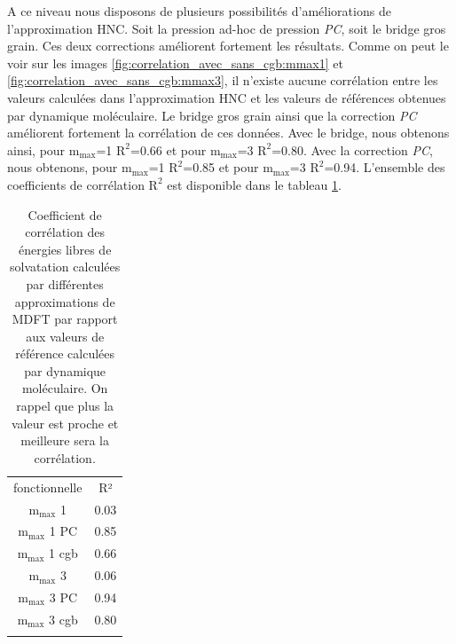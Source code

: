 A ce niveau nous disposons de plusieurs possibilités d'améliorations de l'approximation HNC. Soit la pression ad-hoc de pression \textit{PC}, soit le bridge gros grain. Ces deux corrections améliorent fortement les résultats. Comme on peut le voir sur les images \ref{fig:correlation_avec_sans_cgb:mmax1} et \ref{fig:correlation_avec_sans_cgb:mmax3}, il n'existe aucune corrélation entre les valeurs calculées dans l'approximation HNC et les valeurs de références obtenues par dynamique moléculaire. 
Le bridge gros grain ainsi que la correction \textit{PC} améliorent fortement la corrélation de ces données. Avec le bridge, nous obtenons ainsi, pour $\mathrm{m}_\mathrm{max}$=1 $\mathrm{R}^2$=0.66 et pour $\mathrm{m}_\mathrm{max}$=3 $\mathrm{R}^2$=0.80. Avec la correction \textit{PC}, nous obtenons, pour $\mathrm{m}_\mathrm{max}$=1 $\mathrm{R}^2$=0.85 et pour $\mathrm{m}_\mathrm{max}$=3 $\mathrm{R}^2$=0.94. L'ensemble des coefficients de corrélation $\mathrm{R}^2$ est disponible dans le tableau \ref{tab:correlation}.



\begin{table}[H]
  \begin{center}
    \begin{tabular}{ c c }
      \hline & \\[-1em]\hline
       fonctionnelle  & R²  \\
      \hline
       $\mathrm{m}_\mathrm{max}$ 1      & 0.03  \\
       $\mathrm{m}_\mathrm{max}$ 1 PC   & 0.85  \\
       $\mathrm{m}_\mathrm{max}$ 1 cgb  & 0.66  \\
       $\mathrm{m}_\mathrm{max}$ 3      & 0.06  \\
       $\mathrm{m}_\mathrm{max}$ 3 PC   & 0.94  \\
       $\mathrm{m}_\mathrm{max}$ 3 cgb  & 0.80  \\
      \hline & \\[-1em]\hline%
    \end{tabular}
  \end{center}
  \caption{Coefficient de corrélation des énergies libres de solvatation calculées par différentes approximations de MDFT par rapport aux valeurs de référence calculées par dynamique moléculaire. On rappel que plus la valeur est proche et meilleure sera la corrélation.}
  \label{tab:correlation}  
\end{table}



